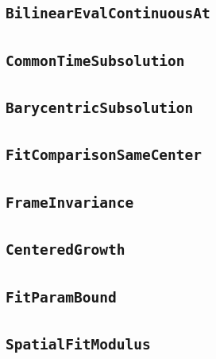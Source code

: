 \documentclass[11pt]{amsart}
\theoremstyle{definition}
\begin{document}
\subsection{\texorpdfstring{\texttt{BilinearEvalContinuousAt}}{BilinearEvalContinuousAt}}\label{node:BilinearEvalContinuousAt}


\subsection{\texorpdfstring{\texttt{CommonTimeSubsolution}}{CommonTimeSubsolution}}\label{node:CommonTimeSubsolution}


\subsection{\texorpdfstring{\texttt{BarycentricSubsolution}}{BarycentricSubsolution}}\label{node:BarycentricSubsolution}


\subsection{\texorpdfstring{\texttt{FitComparisonSameCenter}}{FitComparisonSameCenter}}\label{node:FitComparisonSameCenter}


\subsection{\texorpdfstring{\texttt{FrameInvariance}}{FrameInvariance}}\label{node:FrameInvariance}


\subsection{\texorpdfstring{\texttt{CenteredGrowth}}{CenteredGrowth}}\label{node:CenteredGrowth}


\subsection{\texorpdfstring{\texttt{FitParamBound}}{FitParamBound}}\label{node:FitParamBound}


\subsection{\texorpdfstring{\texttt{SpatialFitModulus}}{SpatialFitModulus}}\label{node:SpatialFitModulus}

\end{document}
